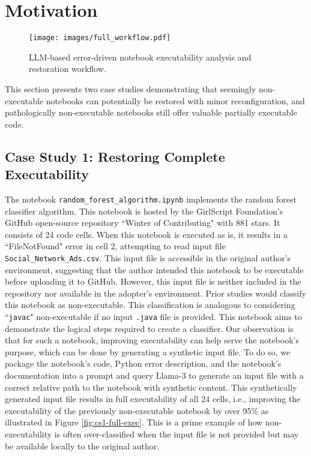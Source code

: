 \section{Motivation}
\label{sec:motivation}


\begin{figure*}[ht!] %
\centerline{\texttt{[image: images/full\_workflow.pdf]}}
    \caption{LLM-based error-driven notebook executability analysis and restoration workflow.}
    \label{fig:main_workflow}
\end{figure*}


This section presents two case studies demonstrating that seemingly non-executable notebooks can potentially be restored with minor reconfiguration, and pathologically non-executable notebooks still offer valuable partially executable code. 


\subsection{Case Study 1: Restoring Complete Executability}
\label{case_study_1}

    The notebook {\small{\texttt{random\_forest\_algorithm.ipynb}}} \cite{girlscript2024} implements the random forest classifier algorithm. This notebook is hosted by the GirlScript Foundation's GitHub open-source repository ``Winter of Contributing" with 881 stars. It consists of 24 code cells. When this notebook is executed as is, it results in a ``FileNotFound" error in cell 2, attempting to read input file {\small{\texttt{Social\_Network\_Ads.csv}}}. This input file is accessible in the original author's environment, suggesting that the author intended this notebook to be executable before uploading it to GitHub. However, this input file is neither included in the repository nor available in the adopter's environment. Prior studies \cite{Pimentel2019, Pimentel2021} would classify this notebook as non-executable. This classification is analogous to considering ``{\small{\texttt{javac}}}" non-executable if no input {\small{\texttt{.java}}} file is provided. This notebook aims to demonstrate the logical steps required to create a classifier. Our observation is that for such a notebook, improving executability can help serve the notebook's purpose, which can be done by generating a synthetic input file. To do so, we package the notebook's code, Python error description, and the notebook's documentation into a prompt and query Llama-3 to generate an input file with a correct relative path to the notebook with synthetic content. This synthetically generated input file results in full executability of all 24 cells, i.e., improving the executability of the previously non-executable notebook by over 95\% as illustrated in Figure \ref{fig:cs1-full-exec}. This is a prime example of how non-executability is often over-classified when the input file is not provided but may be available locally to the original author. 
    

